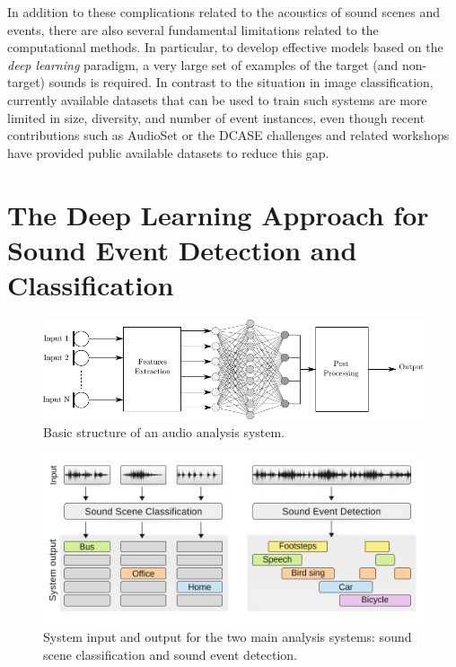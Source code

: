 In addition to these complications related to the acoustics of sound scenes and
events, there are also several fundamental limitations related to the computational methods. In particular, to develop effective models based on the \textit{deep learning} paradigm, a very large set of examples of the
target (and non-target) sounds is required. In contrast to the situation in image classification,
 currently available datasets that can be used to train such systems are more limited in size, diversity, and number of event
 instances, even though recent contributions such as AudioSet \cite{gemmeke2017audio} or the DCASE challenges
and related workshops \cite{DCASE2017Workshop, mesaros2016tut, dcase2018web} have provided public available datasets to reduce this gap.



\section{The Deep Learning Approach for Sound Event Detection and Classification}

\begin{figure}[b]
	\centering
	\includegraphics[width=\linewidth]{img/flowchart_1.pdf}
	\caption[Basic structure]{Basic structure of an audio analysis system.}
	\label{fig:base-system}
\end{figure}

\begin{figure}[tb]
	\centering
	\includegraphics[width=\linewidth]{img/sed_sec.pdf}
	\caption[System input and output ]{System input and output for the two main analysis systems: sound scene classification and sound event detection.}
	\label{fig:system-io}
\end{figure}

